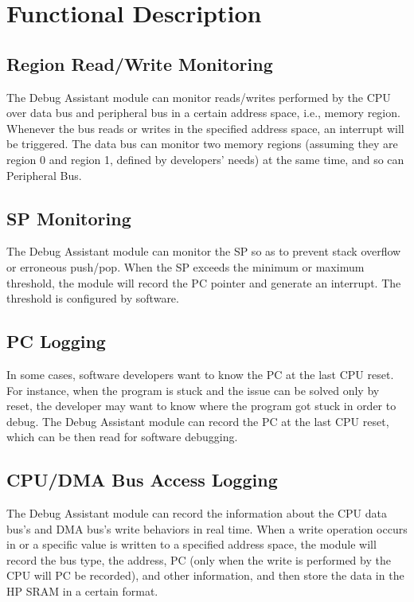 \documentclass[main\_\_EN.tex]{subfiles}
\begin{document}
\section{Functional Description}
\label{sec:dbgassist-func-descr}

\subsection{Region Read/Write Monitoring}

The Debug Assistant module can monitor reads/writes performed by the CPU over data bus and peripheral bus in a certain address space, i.e., memory region. Whenever the bus reads or writes in the specified address space, an interrupt will be triggered. The data bus can monitor two memory regions (assuming they are region 0 and region 1, defined by developers' needs) at the same time, and so can Peripheral Bus.

\subsection{SP Monitoring}

The Debug Assistant module can monitor the SP so as to prevent stack overflow or erroneous push/pop. When the SP exceeds the minimum or maximum threshold, the module will record the PC pointer and generate an interrupt. The threshold is configured by software.

\subsection{PC Logging}

In some cases, software developers want to know the PC at the last CPU reset. For instance, when the program is stuck and the issue can be solved only by reset, the developer may want to know where the program got stuck in order to debug. The Debug Assistant module can record the PC at the last CPU reset, which can be then read for software debugging. 

\subsection{CPU/DMA Bus Access Logging}

The Debug Assistant module can record the information about the CPU data bus's and DMA bus's write behaviors in real time. When a write operation occurs in or a specific value is written to a specified address space, the module will record the bus type, the address, PC (only when the write is performed by the CPU will PC be recorded), and other information, and then store the data in the HP SRAM in a certain format.
\end{document}
